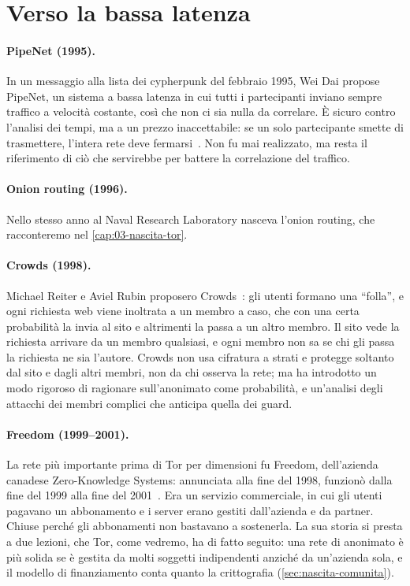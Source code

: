 \section{Verso la bassa latenza}\label{sec:radici-bassa}

\paragraph{PipeNet (1995).} In un messaggio alla lista dei cypherpunk del febbraio 1995, Wei Dai propose PipeNet, un sistema a bassa latenza in cui tutti i partecipanti inviano sempre traffico a velocità costante, così che non ci sia nulla da correlare. È sicuro contro l'analisi dei tempi, ma a un prezzo inaccettabile: se un solo partecipante smette di trasmettere, l'intera rete deve fermarsi~\cite{syverson2011peel}. Non fu mai realizzato, ma resta il riferimento di ciò che servirebbe per battere la correlazione del traffico.

\paragraph{Onion routing (1996).} Nello stesso anno al Naval Research Laboratory nasceva l'onion routing, che racconteremo nel \cref{cap:03-nascita-tor}.

\paragraph{Crowds (1998).} Michael Reiter e Aviel Rubin proposero Crowds~\cite{reiter1998crowds}: gli utenti formano una \enquote{folla}, e ogni richiesta web viene inoltrata a un membro a caso, che con una certa probabilità la invia al sito e altrimenti la passa a un altro membro. Il sito vede la richiesta arrivare da un membro qualsiasi, e ogni membro non sa se chi gli passa la richiesta ne sia l'autore. Crowds non usa cifratura a strati e protegge soltanto dal sito e dagli altri membri, non da chi osserva la rete; ma ha introdotto un modo rigoroso di ragionare sull'anonimato come probabilità, e un'analisi degli attacchi dei membri complici che anticipa quella dei guard.

\paragraph{Freedom (1999--2001).} La rete più importante prima di Tor per dimensioni fu Freedom, dell'azienda canadese Zero-Knowledge Systems: annunciata alla fine del 1998, funzionò dalla fine del 1999 alla fine del 2001~\cite{syverson2011peel}. Era un servizio commerciale, in cui gli utenti pagavano un abbonamento e i server erano gestiti dall'azienda e da partner. Chiuse perché gli abbonamenti non bastavano a sostenerla. La sua storia si presta a due lezioni, che Tor, come vedremo, ha di fatto seguito: una rete di anonimato è più solida se è gestita da molti soggetti indipendenti anziché da un'azienda sola, e il modello di finanziamento conta quanto la crittografia (\cref{sec:nascita-comunita}).

